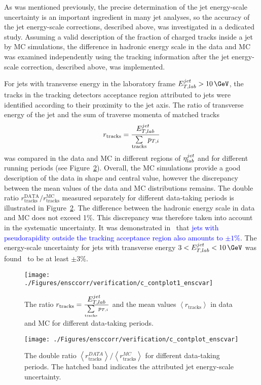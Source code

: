 As  was mentioned previously, the precise determination of the jet energy-scale uncertainty is an important ingredient in many jet analyses, so the accuracy of the jet energy-scale corrections, described above, was investigated in a dedicated study. Assuming a valid description of the fraction of charged tracks inside a jet by MC simulations, the difference in hadronic energy scale in the data and MC was examined independently using the tracking information after the jet energy-scale correction, described above, was implemented. 

For jets with transverse energy in the laboratory frame $\etjetlab > 10\,\GeV$, the tracks in the tracking detectors acceptance region attributed to jets were identified according to their proximity to the jet axis. The ratio of transverse energy of the jet and the sum of traverse momenta of matched tracks 
\begin{equation}
r_\text{tracks} = \frac{\mbox{$E_{T,lab}^{jet}$}}{\sum\limits_{\text{tracks}}{p_{T,i}}}
\end{equation}
was compared in the data and MC in different regions of $\mbox{$\eta^{jet}_{lab}$}$ and for different running periods (see Figure~\ref{fig:ratcalibcontrolplotunc1}). Overall, the MC simulations provide a good description of the data in shape and central value, however the discrepancy between the mean values of the data and MC distributions remains. The double ratio $r_\text{tracks}^\text{DATA}/r_\text{tracks}^\text{MC}$ measured separately for different data-taking periods is illustrated in Figure~\ref{fig:ratcalibcontrolplotunc1}. The difference between the hadronic energy scale in data and MC does not exceed 1\%. This discrepancy was therefore taken into account in the systematic uncertainty. It was demonstrated in~\cite{joerg, php jets presentation unpublished} that \textcolor{blue}{jets with pseudorapidity outside the tracking acceptance region also amounts to $\pm 1\%$}. The energy-scale uncertainty for jets with transverse energy $3<\etjetlab<10\,\GeV$ was found~\cite{joerg} to be at least $\pm 3\%$.
\begin{figure}[h!]
	\centering
		\texttt{[image: ./Figures/ensccorr/verification/c\_contplot1\_enscvar]} 
	\caption{The ratio $r_\text{tracks} = \frac{\mbox{$E_{T,lab}^{jet}$}}{\sum\limits_{\text{tracks}}{p_{T,i}}}$ and the mean values $\left\langle r_\text{tracks}\right\rangle$ in data and MC for different data-taking periods.}
	\label{fig:ratcalibcontrolplotunc}
\end{figure}

\begin{figure}[ht]
	\centering
		\texttt{[image: ./Figures/ensccorr/verification/c\_contplot\_enscvar]} 
	\caption{The double ratio $\left\langle r^{DATA}_\text{tracks}\right\rangle/\left\langle r^{MC}_\text{tracks}\right\rangle$ for different data-taking periods. The hatched band indicates the attributed jet energy-scale uncertainty.}
	\label{fig:ratcalibcontrolplotunc1}
\end{figure}
